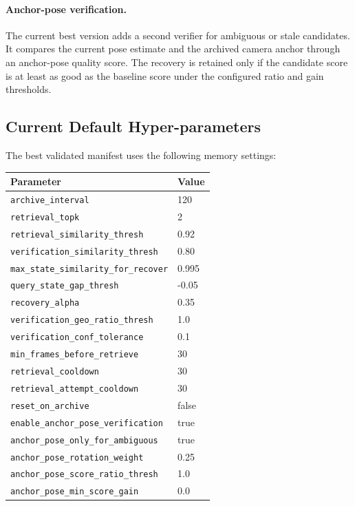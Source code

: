 \documentclass[11pt]{article}
\begin{document}
\paragraph{Anchor-pose verification.}
The current best version adds a second verifier for ambiguous or stale
candidates. It compares the current pose estimate and the archived camera anchor
through an anchor-pose quality score. The recovery is retained only if the
candidate score is at least as good as the baseline score under the configured
ratio and gain thresholds.

\subsection{Current Default Hyper-parameters}
The best validated manifest uses the following memory settings:
\begin{center}
\begin{tabular}{ll}
\toprule
Parameter & Value \\
\midrule
\texttt{archive\_interval} & 120 \\
\texttt{retrieval\_topk} & 2 \\
\texttt{retrieval\_similarity\_thresh} & 0.92 \\
\texttt{verification\_similarity\_thresh} & 0.80 \\
\texttt{max\_state\_similarity\_for\_recover} & 0.995 \\
\texttt{query\_state\_gap\_thresh} & -0.05 \\
\texttt{recovery\_alpha} & 0.35 \\
\texttt{verification\_geo\_ratio\_thresh} & 1.0 \\
\texttt{verification\_conf\_tolerance} & 0.1 \\
\texttt{min\_frames\_before\_retrieve} & 30 \\
\texttt{retrieval\_cooldown} & 30 \\
\texttt{retrieval\_attempt\_cooldown} & 30 \\
\texttt{reset\_on\_archive} & false \\
\texttt{enable\_anchor\_pose\_verification} & true \\
\texttt{anchor\_pose\_only\_for\_ambiguous} & true \\
\texttt{anchor\_pose\_rotation\_weight} & 0.25 \\
\texttt{anchor\_pose\_score\_ratio\_thresh} & 1.0 \\
\texttt{anchor\_pose\_min\_score\_gain} & 0.0 \\
\bottomrule
\end{tabular}
\end{center}
\end{document}
